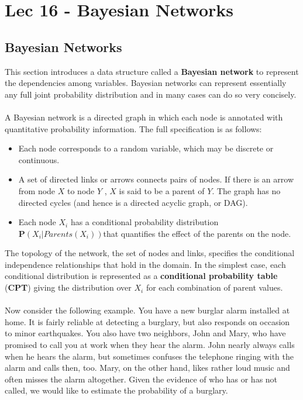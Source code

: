 \chapter{Lec 16 - Bayesian Networks}
\section{Bayesian Networks}
This section introduces a data structure called a \textbf{Bayesian network} to represent the dependencies among variables. Bayesian networks can represent essentially
any full joint probability distribution and in many cases can do so very concisely.\\\\
A Bayesian network is a directed graph in which each node is annotated with quantitative probability information. The full specification is as follows:
\begin{itemize}
    \item  Each node corresponds to a random variable, which may be discrete or continuous.

    \item A set of directed links or arrows connects pairs of nodes. If there is an arrow from node $X$ to node $Y$ , $X$ is said to be a parent of $Y$. The graph has no directed cycles (and hence is a directed acyclic graph, or DAG).

    \item  Each node $X_i$ has a conditional probability distribution $\textbf{P}(X_i | Parents(X_i)) $that quantifies the effect of the parents on the node.
\end{itemize}
The topology of the network, the set of nodes and links, specifies the conditional independence relationships that hold in the domain. In the simplest case, each conditional distribution is represented as a \textbf{conditional probability table} (\textbf{CPT}) giving the distribution over $X_i$ for each combination of parent values.\\\\
Now consider the following example.  You have a new burglar alarm installed at home. It is fairly reliable at detecting a burglary, but also responds on occasion to minor earthquakes. You also have two neighbors, John and Mary, who have promised to call you at work when they hear the alarm. John nearly always calls when he hears the alarm, but sometimes confuses the telephone ringing with the alarm and calls then, too. Mary, on the other hand, likes rather loud music and often misses the alarm altogether. Given the evidence of who has or has not called, we would like to estimate the probability of a burglary.
